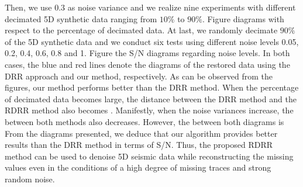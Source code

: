 Then, we use $0.3$ as noise variance and we realize nine experiments with different decimated 5D synthetic data ranging from $10\% $ to $90\% $. Figure   diagrams with respect to the percentage of decimated data. At last, we randomly decimate $90\%$ of the 5D synthetic data and we conduct six tests using different noise levels 0.05, 0.2, 0.4, 0.6, 0.8 and 1. 
Figure  the S/N diagrams regarding noise levels. In both cases, the blue and red lines denote the diagrams of the restored data using the DRR approach and our method, respectively. As can be observed from the figures, our method performs better than the DRR method. When the percentage of decimated data becomes large, the distance between the DRR method and the RDRR method also becomes . Manifestly, when the noise variances increase, the  between both methods also decreases. However, the  between both diagrams is  From the diagrams presented, we deduce that our algorithm provides better results than the DRR method in terms of S/N. Thus, the proposed RDRR method can be used to denoise 5D seismic data while reconstructing the missing values even in the conditions of a high degree of missing traces and strong random noise.



